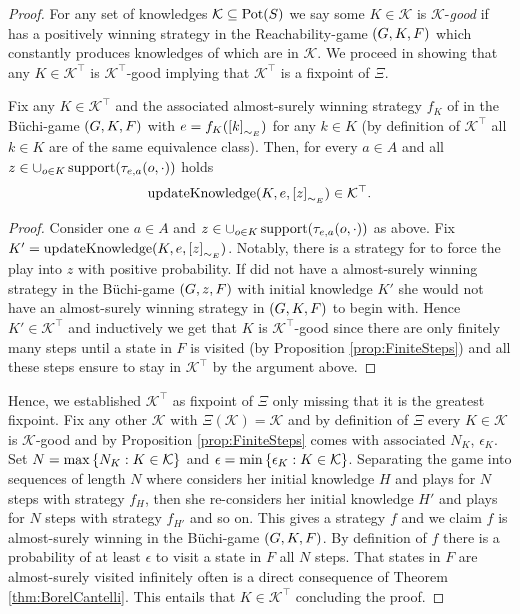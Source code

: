 \begin{proof}
  For any set of knowledges $\mathcal{K}\subseteq\operatorname{Pot}(S)$ we say some 
  $K\in\mathcal{K}$ is $\mathcal{K}$-\emph{good} if \eve{} has a positively
  winning strategy in the Reachability-game $\left(G, K, F\right)$ which constantly
  produces knowledges of \eve{} which are in $\mathcal{K}$. We proceed in 
  showing that any $K\in\mathcal{K}^{\top}$ is $\mathcal{K}^{\top}$-good 
  implying that $\mathcal{K}^{\top}$ is a fixpoint of $\Xi$.
  \begin{lemma}
    Fix any $K\in\mathcal{K}^{\top}$ and the associated almost-surely winning
    strategy $f_{K}$ of \eve{} in the Büchi-game $\left(G, K, F\right)$ with 
    $e = f_{K}(\left[k\right]_{\sim_{E}})$ for any $k\in K$ (by definition of 
    $\mathcal{K}^{\top}$ all $k\in K$ are of the same equivalence class). Then,
    for every $a\in A$ and all 
    $z\in \cup_{o\in K}\operatorname{support}(\tau_{e,a}(o,\cdot))$ holds
    \begin{equation*}
      \operatorname{updateKnowledge}(K, e, \left[z\right]_{\sim_{E}})\in\mathcal{K}^{\top}.
    \end{equation*}
  \end{lemma}
  \begin{proof}
    Consider one $a\in A$ and $z\in \cup_{o\in K}\operatorname{support}(\tau_{e,a}(o,\cdot))$
    as above. Fix $K' = \operatorname{updateKnowledge}(K, e, \left[z\right]_{\sim_{E}})$. Notably, there is
    a strategy for \adam{} to force the play into $z$ with positive 
    probability. If \eve{} did not have a almost-surely winning strategy in the
    Büchi-game $\left(G, z, F\right)$ with initial knowledge $K'$ she would not have
    an almost-surely winning strategy in $\left(G, K, F\right)$ to begin with. Hence
    $K'\in\mathcal{K}^{\top}$ and inductively we get that $K$ is 
    $\mathcal{K}^{\top}$-good since there are only finitely many steps until a 
    state in $F$ is visited (by Proposition \ref{prop:FiniteSteps}) and all 
    these steps ensure to stay in $\mathcal{K}^{\top}$ by the argument above.
  \end{proof}
  Hence, we established $\mathcal{K}^{\top}$ as fixpoint of $\Xi$ only missing
  that it is the greatest fixpoint. Fix any other $\mathcal{K}$ with 
  $\Xi(\mathcal{K}) = \mathcal{K}$ and by definition of $\Xi$ every 
  $K\in\mathcal{K}$ is $\mathcal{K}$-good and by Proposition 
  \ref{prop:FiniteSteps} comes with associated $N_{K}$, $\epsilon_{K}$. Set
  $N = \max\left\{N_{K}:K\in\mathcal{K}\right\}$ and 
  $\epsilon = \min\left\{\epsilon_{K}:K\in\mathcal{K}\right\}$. Separating the game into
  sequences of length $N$ where \eve{} considers her initial knowledge $H$ and
  plays for $N$ steps with strategy $f_{H}$, then she re-considers her initial
  knowledge $H'$ and plays for $N$ steps with strategy $f_{H'}$ and so on. This
  gives a strategy $f$ and we claim $f$ is almost-surely winning in the 
  Büchi-game $\left(G, K, F\right)$. By definition of $f$ there is a probability of
  at least $\epsilon$ to visit a state in $F$ all $N$ steps. That states in $F$
  are almost-surely visited infinitely often is a direct consequence of 
  Theorem \ref{thm:BorelCantelli}. This entails that $K\in\mathcal{K}^{\top}$
  concluding the proof.
\end{proof}
